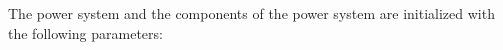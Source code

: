 The power system and the components of the power system are initialized with the following parameters:

%	
%	
%	
%	
%	
%	

